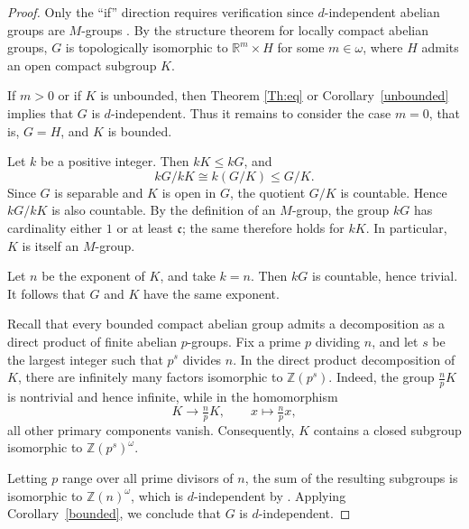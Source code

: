 \documentclass[12pt]{amsart}
\newtheorem{corollary}[theorem]{Corollary}
\theoremstyle{definition}
\theoremstyle{remark}
\def\c {{\mathfrak{c}}}
\begin{document}
\begin{proof}
Only the ``if'' direction requires verification since $d$-independent abelian groups are $M$-groups \cite[Proposition 2.1]{MT}.
By the structure theorem for locally compact abelian groups,
$G$ is topologically isomorphic to $\mathbb{R}^m\times H$ for some
$m\in\omega$, where $H$ admits an open compact subgroup $K$.

If $m>0$ or if $K$ is unbounded, then Theorem \ref{Th:eq} or Corollary~\ref{unbounded} implies that
$G$ is $d$-independent.
Thus it remains to consider the case $m=0$, that is, $G=H$, and $K$ is
bounded.

Let $k$ be a positive integer.
Then $kK\leq kG$, and
\[
kG/kK\cong k(G/K)\leq G/K.
\]
Since $G$ is separable and $K$ is open in $G$, the quotient $G/K$ is
countable.
Hence $kG/kK$ is also countable.
By the definition of an $M$-group, the group $kG$ has cardinality either $1$
or at least $\mathfrak{c}$; the same therefore holds for $kK$.
In particular, $K$ is itself an $M$-group.

Let $n$ be the exponent of $K$, and take $k=n$.
Then $kG$ is countable, hence trivial.
It follows that $G$ and $K$ have the same exponent.

Recall that every bounded compact abelian group admits a decomposition as a
direct product of finite abelian $p$-groups.
Fix a prime $p$ dividing $n$, and let $s$ be the largest integer such that
$p^s$ divides $n$.
In the direct product decomposition of $K$, there are infinitely many
factors isomorphic to $\mathbb{Z}(p^s)$.
Indeed, the group $\frac{n}{p}K$ is nontrivial and hence infinite, while in
the homomorphism
\[
K\to \tfrac{n}{p}K,\qquad x\mapsto \tfrac{n}{p}x,
\]
all other primary components vanish.
Consequently, $K$ contains a closed subgroup isomorphic to
$\mathbb{Z}(p^s)^\omega$.

Letting $p$ range over all prime divisors of $n$, the sum of the resulting
subgroups is isomorphic to $\mathbb{Z}(n)^\omega$, which is $d$-independent by \cite[Theorem 3.7]{MT}.
Applying Corollary~\ref{bounded}, we conclude that $G$ is $d$-independent.
\end{proof}



\end{document}
